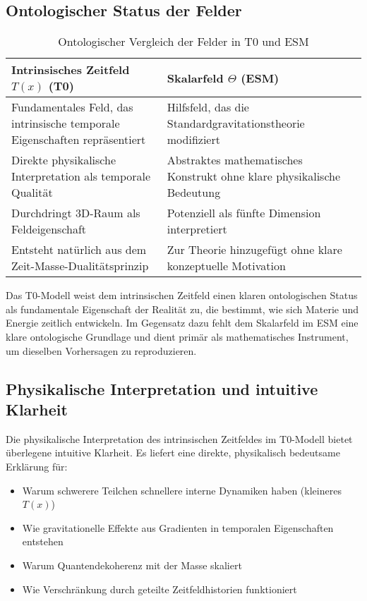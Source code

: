\documentclass[12pt,a4paper]{article}
\newcommand{\Tfield}{T(x)}
\begin{document}
	\subsection{Ontologischer Status der Felder}
	\label{subsec:ontological_status}
	
	\begin{table}[ht]
		\centering
		\caption{Ontologischer Vergleich der Felder in T0 und ESM}
		\label{tab:ontological_comparison}
		\begin{tabular}{p{}|p{}}
			\hline
			\textbf{Intrinsisches Zeitfeld \(\Tfield\) (T0)} & \textbf{Skalarfeld \(\Theta\) (ESM)} \\
			\hline
			Fundamentales Feld, das intrinsische temporale Eigenschaften repräsentiert & Hilfsfeld, das die Standardgravitationstheorie modifiziert \\
			\hline
			Direkte physikalische Interpretation als temporale Qualität & Abstraktes mathematisches Konstrukt ohne klare physikalische Bedeutung \\
			\hline
			Durchdringt 3D-Raum als Feldeigenschaft & Potenziell als fünfte Dimension interpretiert \\
			\hline
			Entsteht natürlich aus dem Zeit-Masse-Dualitätsprinzip & Zur Theorie hinzugefügt ohne klare konzeptuelle Motivation \\
			\hline
		\end{tabular}
	\end{table}
	
	Das T0-Modell weist dem intrinsischen Zeitfeld einen klaren ontologischen Status als fundamentale Eigenschaft der Realität zu, die bestimmt, wie sich Materie und Energie zeitlich entwickeln. Im Gegensatz dazu fehlt dem Skalarfeld im ESM eine klare ontologische Grundlage und dient primär als mathematisches Instrument, um dieselben Vorhersagen zu reproduzieren.
	
	\subsection{Physikalische Interpretation und intuitive Klarheit}
	\label{subsec:physical_interpretation}
	
	Die physikalische Interpretation des intrinsischen Zeitfeldes im T0-Modell bietet überlegene intuitive Klarheit. Es liefert eine direkte, physikalisch bedeutsame Erklärung für:
	
	\begin{itemize}
		\item Warum schwerere Teilchen schnellere interne Dynamiken haben (kleineres \(\Tfield\))
		\item Wie gravitationelle Effekte aus Gradienten in temporalen Eigenschaften entstehen
		\item Warum Quantendekoherenz mit der Masse skaliert
		\item Wie Verschränkung durch geteilte Zeitfeldhistorien funktioniert
	\end{itemize}
	
\end{document}
